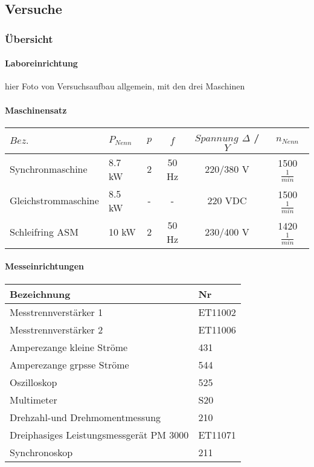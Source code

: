 \begin{flushleft}
\part{Versuche}

\section{Übersicht}

\subsection{Laboreinrichtung}


hier Foto von Versuchsaufbau allgemein, mit den drei Maschinen

\subsection{Maschinensatz}








\begin{tabular}{|L{5cm}|l|c|c|c|c|}
 \hline
  \textbf{$Bez.$} & \textbf{$P_{Nenn}$} & \textbf{$p$} & \textbf{$f$} & \textbf{$Spannung$ $\Delta$ / $Y$} & \textbf{$n_{Nenn}$}  \\
 \hline
Synchronmaschine&8.7 kW &2 &50 Hz&220/380 V&1500 $\frac{1}{min}$\\
\hline
Gleichstrommaschine&8.5 kW & - & - & 220 VDC& 1500 $\frac{1}{min}$\\
\hline
Schleifring ASM &10 kW &2&50 Hz& 230/400 V& 1420 $\frac{1}{min}$\\
\hline

\end{tabular}






\subsection{Messeinrichtungen}




\begin{tabular}{|L{0.8 \textwidth}|l|}
 \hline
  \textbf{Bezeichnung} & \textbf{Nr}  \\
 \hline
 Messtrennverstärker 1  & ET11002  \\
\hline
Messtrennverstärker 2  & ET11006  \\
\hline
Amperezange kleine Ströme & 431  \\
\hline
Amperezange grpsse Ströme & 544  \\
\hline
Oszilloskop  & 525  \\
\hline
Multimeter  & S20  \\
\hline
Drehzahl-und Drehmomentmessung  & 210  \\
\hline
Dreiphasiges Leistungsmessgerät PM 3000  & ET11071  \\
\hline
Synchronoskop   & 211  \\
\hline
\end{tabular}





\end{flushleft}

